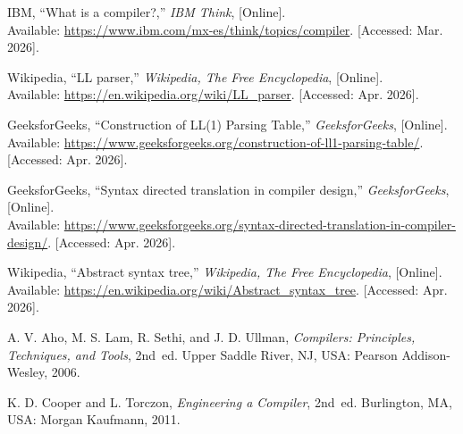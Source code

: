 \documentclass[letterpaper,12pt,oneside]{article}
\begin{document}
\noindent [1] IBM, ``What is a compiler?,'' \textit{IBM Think}, [Online].\\
Available: \url{https://www.ibm.com/mx-es/think/topics/compiler}.
[Accessed: Mar. 2026].

\vspace{6pt}
\noindent [2] Wikipedia, ``LL parser,'' \textit{Wikipedia, The Free
Encyclopedia}, [Online].\\
Available: \url{https://en.wikipedia.org/wiki/LL_parser}.
[Accessed: Apr. 2026].

\vspace{6pt}
\noindent [3] GeeksforGeeks, ``Construction of LL(1) Parsing Table,''
\textit{GeeksforGeeks}, [Online].\\
Available: \url{https://www.geeksforgeeks.org/construction-of-ll1-parsing-table/}.
[Accessed: Apr. 2026].

\vspace{6pt}
\noindent [4] GeeksforGeeks, ``Syntax directed translation in compiler design,''
\textit{GeeksforGeeks}, [Online].\\
Available: \url{https://www.geeksforgeeks.org/syntax-directed-translation-in-compiler-design/}.
[Accessed: Apr. 2026].

\vspace{6pt}
\noindent [5] Wikipedia, ``Abstract syntax tree,'' \textit{Wikipedia, The Free
Encyclopedia}, [Online].\\
Available: \url{https://en.wikipedia.org/wiki/Abstract_syntax_tree}.
[Accessed: Apr. 2026].

\vspace{6pt}
\noindent [6] A. V. Aho, M. S. Lam, R. Sethi, and J. D. Ullman,
\textit{Compilers: Principles, Techniques, and Tools}, 2nd~ed.
Upper Saddle River, NJ, USA: Pearson Addison-Wesley, 2006.

\vspace{6pt}
\noindent [7] K. D. Cooper and L. Torczon,
\textit{Engineering a Compiler}, 2nd~ed.
Burlington, MA, USA: Morgan Kaufmann, 2011.
\end{document}
